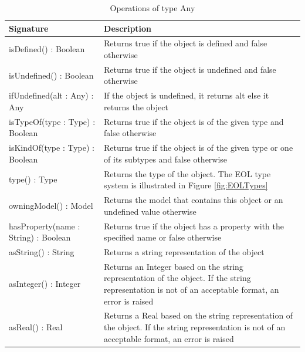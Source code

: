 \begin{longtabu} {|p{6.5cm}|X|}
			
			\caption{Operations of type Any}
			\label{tab:AnyOperations}\\
			
			\hline
							
			\textbf{Signature} & \textbf{Description} \\\hline

			isDefined() : Boolean & Returns true if the object is defined and false otherwise \\\hline
			
			isUndefined() : Boolean & Returns true if the object is undefined and false otherwise \\\hline
			
			ifUndefined(alt : Any) : Any & If the object is undefined, it returns alt else it returns the object \\\hline
			
			isTypeOf(type : Type) : Boolean & Returns true if the object is of the given type and false otherwise \\\hline
			
			isKindOf(type : Type) : Boolean & Returns true if the object is of the given type or one of its subtypes and false otherwise \\\hline
			
			type() : Type & Returns the type of the object. The EOL type system is illustrated in Figure \ref{fig:EOLTypes} \\\hline

                        owningModel() : Model & Returns the model that contains this object or an undefined value otherwise \\\hline

                        hasProperty(name : String) : Boolean & Returns true if the object has a property with the specified name or false otherwise \\\hline
                        
			asString() : String & Returns a string representation of the object \\\hline
			
			asInteger() : Integer & Returns an Integer based on the string representation of the object. If the string representation is not of an acceptable format, an error is raised \\\hline
			
			asReal() : Real & Returns a Real based on the string representation of the object. If the string representation is not of an acceptable format, an error is raised \\\hline
			

\end{longtabu}

